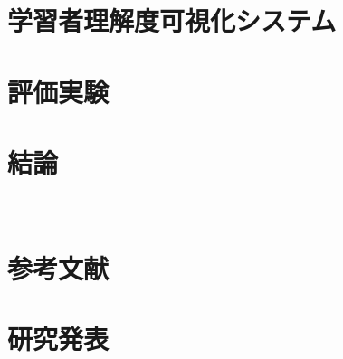 %
%
\chapter{学習者理解度可視化システム}
\label{chap:system}


%
%
\chapter{評価実験}
\label{chap:experiment}


%
%
\chapter{結論}
\label{chap:conclusion}


%
%
\acknowledgement　%


%
%
\chapter*{参考文献}


%
%
\chapter*{研究発表}


%
% 

